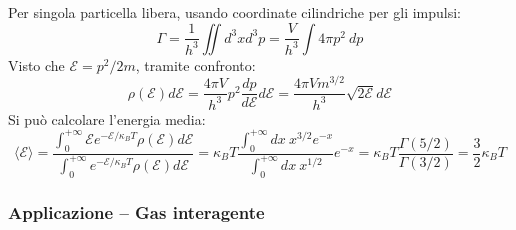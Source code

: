 \documentclass[10pt, a4paper]{scrartcl}
\numberwithin{equation}{subsection}
\theoremstyle{style1}
\theoremstyle{style2}
\begin{document}
Per singola particella libera, usando coordinate cilindriche per gli impulsi:
\begin{equation}
	\Gamma = \frac{1}{h^3} \iint d^3 x d^3 p = \frac{V}{h^3} \int 4\pi  p^2 \ dp
\end{equation}
Visto che $\mathscr{E} = p^2 / 2m$, tramite confronto:
\begin{equation}
	\rho (\mathscr{E})d \mathscr{E} = \frac{4\pi V }{h^3}p^2 \frac{d p}{d \mathscr{E}} d \mathscr{E}= \frac{4\pi V m^{3 / 2} }{h^3}\sqrt{2 \mathscr{E}} d \mathscr{E}
\end{equation}
Si pu\`o calcolare l'energia media:
\begin{equation*}
		\langle \mathscr{E} \rangle = \frac{\displaystyle \int_{0} ^{+\infty} \mathscr{E} e^{ - \mathscr{E} / \kappa _B T}  \rho (\mathscr{E}) d \mathscr{E}  }{\displaystyle \int_{0} ^{+\infty} e^{ - \mathscr{E} / \kappa _B T}  \rho (\mathscr{E}) d \mathscr{E}  }= \kappa _B T \frac{\displaystyle \int_{0} ^{+\infty} dx \ x^{3 / 2} e^{ - x} }{\displaystyle \int_{0} ^{+\infty}dx \ x^{1 / 2} } e ^{-x} = \kappa_B T \frac{\Gamma(5 / 2)}{\Gamma (3/2)} = \frac{3}{2} \kappa _B T
\end{equation*}
\subsubsection{Applicazione -- Gas interagente}
\end{document}
